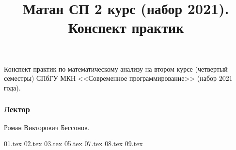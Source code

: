 \documentclass[a4paper,14pt]{extarticle}
\title{Матан СП 2 курс (набор 2021). \\ Конспект практик}
\theoremstyle{definition}
\theoremstyle{plain}
\theoremstyle{plain}
\theoremstyle{plain}
\theoremstyle{plain}
\theoremstyle{definition}
\theoremstyle{definition}
\theoremstyle{definition}
\theoremstyle{definition}
\theoremstyle{definition}
\theoremstyle{definition}
\theoremstyle{definition}
\theoremstyle{definition}
\theoremstyle{definition}
\theoremstyle{plain}
\theoremstyle{plain}
\theoremstyle{plain}
\theoremstyle{plain}
\theoremstyle{definition}
\theoremstyle{definition}
\theoremstyle{definition}
\theoremstyle{definition}
\theoremstyle{definition}
\theoremstyle{definition}
\theoremstyle{definition}
\begin{document}
\maketitle
Конспект практик по математическому анализу на втором курсе (четвертый семестры) СПбГУ МКН <<Современное программирование>> (набор 2021 года).
\subsubsection*{Лектор}
Роман Викторович Бессонов.
\newpage
\tableofcontents
\newpage

{01.tex}
{02.tex}
{03.tex}
{05.tex}
{07.tex}
{08.tex}
{09.tex}
\end{document}
